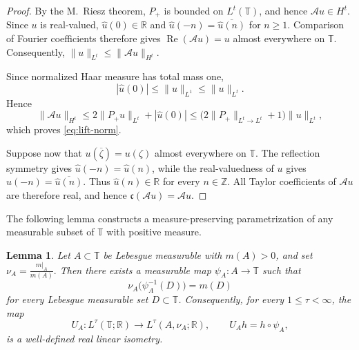 \documentclass[10pt,a4paper]{amsart}
\newtheorem{lemma}[theorem]{Lemma}
\newcommand{\T}{\mathbb{T}}
\newcommand{\R}{\mathbb{R}}
\begin{document}
\begin{proof}
By the M.~Riesz theorem, \(P_+\) is bounded on \(L^t(\T)\), and hence
\(\mathcal Au\in H^t\). Since \(u\) is real-valued,
\(\widehat u(0)\in\mathbb R\) and
\(\widehat u(-n)=\overline{\widehat u(n)}\) for \(n\ge1\).
Comparison of Fourier coefficients therefore gives
\(\operatorname{Re}(\mathcal Au)=u\) almost everywhere on \(\T\).
Consequently,
\(
\|u\|_{L^t}\le\|\mathcal Au\|_{H^t}.
\)

Since normalized Haar measure has total mass one,
\[
        |\widehat u(0)|
        \le
        \|u\|_{L^1}
        \le
        \|u\|_{L^t}.
\]
Hence
\[
        \|\mathcal Au\|_{H^t}
        \le
        2\|P_+u\|_{L^t}+|\widehat u(0)|
        \le
        \bigl(2\|P_+\|_{L^t\to L^t}+1\bigr)\|u\|_{L^t},
\]
which proves \eqref{eq:lift-norm}.

Suppose now that
\(u(\overline\zeta)=u(\zeta)\) almost everywhere on \(\T\).
The reflection symmetry gives
\(\widehat u(-n)=\widehat u(n)\), while the real-valuedness of \(u\)
gives
\(\widehat u(-n)=\overline{\widehat u(n)}\).
Thus \(\widehat u(n)\in\mathbb R\) for every \(n\in\mathbb Z\).
All Taylor coefficients of \(\mathcal Au\) are therefore real, and
hence
\(\mathfrak c(\mathcal Au)=\mathcal Au\).
\end{proof}

The following lemma constructs a measure-preserving parametrization
of any measurable subset of \(\T\) with positive measure.

\begin{lemma}
\label{lem:mp-param}
Let \(A\subset\T\) be Lebesgue measurable with \(m(A)>0\), and set
\(\nu_A=\frac{m|_A}{m(A)}.
\)
Then there exists a measurable map
\(\psi_A:A\to\T\) such that
\[
        \nu_A\bigl(\psi_A^{-1}(D)\bigr)=m(D)
\]
for every Lebesgue measurable set \(D\subset\T\). Consequently, for
every \(1\le\tau<\infty\), the map
\[
        U_A:L^\tau(\T;\R)\to L^\tau(A,\nu_A;\R),
        \qquad
        U_Ah=h\circ\psi_A,
\]
is a well-defined real linear isometry.
\end{lemma}
\end{document}
